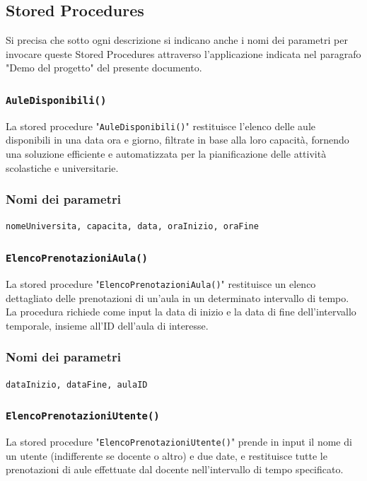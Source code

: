 \documentclass[a4paper, 10pt, oneside]{article} %
\begin{document}
\subsection{Stored Procedures}

Si precisa che sotto ogni descrizione si indicano anche i nomi dei parametri per invocare queste Stored Procedures attraverso l'applicazione indicata nel paragrafo "Demo del progetto" del presente documento. 

\subsubsection*{\texttt{AuleDisponibili()}}


La stored procedure "\texttt{AuleDisponibili()}" restituisce l'elenco delle aule disponibili in una data ora e giorno, filtrate in base alla loro capacità, fornendo una soluzione efficiente e automatizzata per la pianificazione delle attività scolastiche e universitarie.

\subsubsection*{Nomi dei parametri}

\texttt{nomeUniversita, capacita, data, oraInizio, oraFine}

\subsubsection*{\texttt{ElencoPrenotazioniAula()}}

La stored procedure "\texttt{ElencoPrenotazioniAula()}" restituisce un elenco dettagliato delle prenotazioni di un'aula in un determinato intervallo di tempo. La procedura richiede come input la data di inizio e la data di fine dell'intervallo temporale, insieme all'ID dell'aula di interesse.

\subsubsection*{Nomi dei parametri}

\texttt{dataInizio, dataFine, aulaID}

\subsubsection*{\texttt{ElencoPrenotazioniUtente()}}

La stored procedure "\texttt{ElencoPrenotazioniUtente()}" prende in input il nome di un utente (indifferente se docente o altro) e due date, e restituisce tutte le prenotazioni di aule effettuate dal docente nell'intervallo di tempo specificato.
\end{document}
